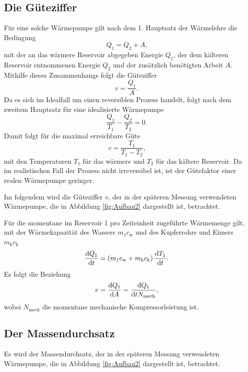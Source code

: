 \subsection{Die Güteziffer}
Für eine solche Wärmepumpe gilt nach dem 1. Hauptsatz der Wärmelehre die Bedingung
\begin{equation}
Q_1 = Q_2 + A\label{eq:Q1}\text{,}
\end{equation}
mit der an das wärmere Reservoir abgegeben Energie $Q_1$, der dem kälteren
Reservoir entnommenen Energie $Q_2$ und der zusätzlich benötigten Arbeit $A$.
Mithilfe dieses Zusammenhangs folgt die Güteziffer
\begin{equation}
v = \frac{Q_1}{A}\label{eq:v1}\text{.}
\end{equation}
Da es sich im Idealfall um einen reversiblen Prozess handelt, folgt nach dem zweitem Hauptsatz für eine idealisierte Wärmepumpe
\begin{equation}
\frac{Q_1}{T_1}-\frac{Q_2}{T_2}=0\label{eq:redQ}\text{.}
\end{equation}
Damit folgt für die maximal erreichbare Güte
\begin{equation}
v = \frac{T_1}{T_1-T_2}\label{eq:vid}\text{,}
\end{equation}
mit den Temperaturen $T_1$ für das wärmere und $T_2$ für das kältere Reservoir.
Da im realistischen Fall der Prozess nicht irreversibel ist, ist der Gütefaktor einer realen Wärmepumpe geringer.


Im folgendem wird die Güteziffer $v$, der in der späteren Messung verwendeten Wärmepumpe, die in Abbildung \ref{fig:Aufbau2} dargestellt ist, betrachtet. 


Für die momentane im Reservoir 1 pro Zeiteinheit zugeführte Wärmemenge gilt, mit der Wärmekapazität des Wassers $m_1c_\text{w}$ und des Kupferrohrs und Eimers $m_\text{k}c_\text{k}$
\begin{equation}
  \frac{\mathop{}\!\mathrm{d} Q_1}{\mathop{}\!\mathrm{d} t} = \left( m_1c_\text{w} + m_\text{k}c_\text{k}\right) \frac{\mathop{}\!\mathrm{d} T_1}{\mathop{}\!\mathrm{d} t}\text{.}\label{eq:T1Q1}
\end{equation}
Es folgt die Beziehung
\begin{equation}
	v = \frac{\mathop{}\!\mathrm{d} Q_1}{\mathop{}\!\mathrm{d} A} = \frac{\mathop{}\!\mathrm{d} Q_1}{\mathop{}\!\mathrm{d} t N_\text{mech}}\text{,}\label{eq:v}
\end{equation}
wobei $N_\text{mech}$ die momentane mechanische Kompressorleistung ist.

\subsection{Der Massendurchsatz}
Es wird der Massendurchsatz, der in der späteren Messung verwendeten Wärmepumpe, die in Abbildung \ref{fig:Aufbau2} dargestellt ist, betrachtet.


